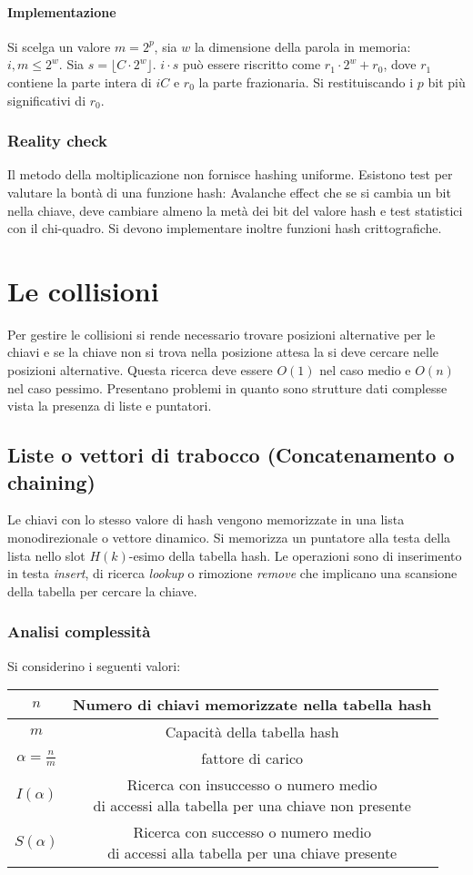 \paragraph{Implementazione}
Si scelga un valore $m=2^p$, sia $w$ la dimensione della parola in memoria: $i, m\le 2^w$. Sia $s=\lfloor C\cdot 2^w\rfloor$. $i\cdot s$ pu\`o essere 
riscritto come $r_1\cdot 2^w+r_0$, dove $r_1$ contiene la parte intera di $iC$ e $r_0$ la parte frazionaria. Si restituiscando i $p$ bit pi\`u significativi
di $r_0$.
\subsubsection{Reality check}
Il metodo della moltiplicazione non fornisce hashing uniforme. Esistono test per valutare la bont\`a di una funzione hash: Avalanche effect che se si cambia
un bit nella chiave, deve cambiare almeno la met\`a dei bit del valore hash e test statistici con il chi-quadro. Si devono implementare inoltre funzioni 
hash crittografiche. 
\section{Le collisioni}
Per gestire le collisioni si rende necessario trovare posizioni alternative per le chiavi e se la chiave non si trova nella posizione attesa la si deve 
cercare nelle posizioni alternative. Questa ricerca deve essere $O(1)$ nel caso medio e $O(n)$ nel caso pessimo. Presentano problemi in quanto sono 
strutture dati complesse vista la presenza di liste e puntatori.
\subsection{Liste o vettori di trabocco (Concatenamento o chaining)}
Le chiavi con lo stesso valore di hash vengono memorizzate in una lista monodirezionale o vettore dinamico. Si memorizza un puntatore alla testa della lista
nello slot $H(k)$-esimo della tabella hash. Le operazioni sono di inserimento in testa \emph{insert}, di ricerca \emph{lookup} o rimozione \emph{remove} che
implicano una scansione della tabella per cercare la chiave.
\subsubsection{Analisi complessit\`a}
Si considerino i seguenti valori:
\begin{center}
\begin{tabular}{|c|c|}
\hline
$n$ & Numero di chiavi memorizzate nella tabella hash\\
\hline
$m$ & Capacit\`a della tabella hash\\
\hline
$\alpha=\frac{n}{m}$ & fattore di carico\\
\hline
$I(\alpha)$ & \makecell{Ricerca con insuccesso o numero medio \\di accessi alla tabella per una chiave non presente}\\
\hline
$S(\alpha)$ & \makecell{Ricerca con successo o numero medio \\di accessi alla tabella per una chiave presente}\\
\hline
\end{tabular}
\end{center}
